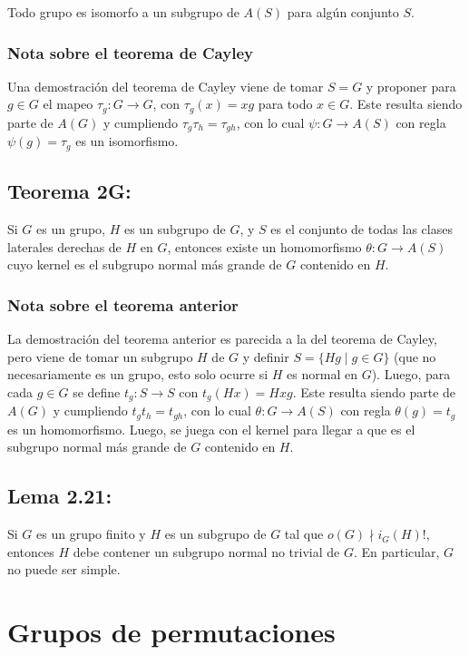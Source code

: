 \documentclass{article}
\begin{document}
Todo grupo es isomorfo a un subgrupo de $A(S)$ para algún conjunto $S$.

\subsubsection*{\color{teal} Nota sobre el teorema de Cayley}

Una demostración del teorema de Cayley viene de tomar $S=G$ y proponer para $g\in G$ el mapeo $\tau_g:G\to G$, con $\tau_g(x)=xg$ para todo $x\in G$. Este resulta siendo parte de $A(G)$ y cumpliendo $\tau_g\tau_h=\tau_{gh}$, con lo cual $\psi:G\to A(S)$ con regla $\psi(g)=\tau_g$ es un isomorfismo.

\subsection*{\color{red} Teorema 2G:}

Si $G$ es un grupo, $H$ es un subgrupo de $G$, y $S$ es el conjunto de todas las clases laterales derechas de $H$ en $G$, entonces existe un homomorfismo $\theta:G\to A(S)$ cuyo kernel es el subgrupo normal más grande de $G$ contenido en $H$.

\subsubsection*{\color{teal} Nota sobre el teorema anterior}

La demostración del teorema anterior es parecida a la del teorema de Cayley, pero viene de tomar un subgrupo $H$ de $G$ y definir $S=\{Hg\mid g\in G\}$ (que no necesariamente es un grupo, esto solo ocurre si $H$ es normal en $G$). Luego, para cada $g\in G$ se define $t_g:S\to S$ con $t_g(Hx)=Hxg$. Este resulta siendo parte de $A(G)$ y cumpliendo $t_gt_h=t_{gh}$, con lo cual $\theta:G\to A(S)$ con regla $\theta(g)=t_g$ es un homomorfismo. Luego, se juega con el kernel para llegar a que es el subgrupo normal más grande de $G$ contenido en $H$.

\subsection*{\color{blue} Lema 2.21:}

Si $G$ es un grupo finito y $H$ es un subgrupo de $G$ tal que $o(G)\nmid i_G(H)!$, entonces $H$ debe contener un subgrupo normal no trivial de $G$. En particular, $G$ no puede ser simple.

\newpage
\section{Grupos de permutaciones}
\end{document}
